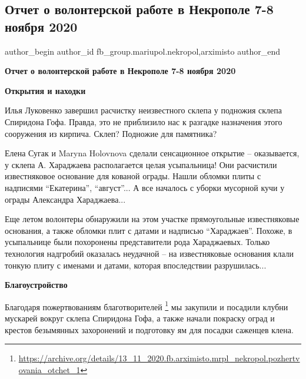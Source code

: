  
 
 
 
 

\subsection{Отчет о волонтерской работе в Некрополе 7-8 ноября 2020}
\label{sec:13_11_2020.fb.fb_group.mariupol.nekropol.2.otchet_volonter_rabota_7_8_nojabrja_2020}
 
\ifcmt
 author_begin
   author_id fb_group.mariupol.nekropol,arximisto
 author_end
\fi

\textbf{Отчет о волонтерской работе в Некрополе 7-8 ноября 2020}

\textbf{Открытия и находки}

Илья Луковенко завершил расчистку неизвестного склепа у подножия склепа
Спиридона Гофа. Правда, это не приблизило нас к разгадке назначения этого
сооружения из кирпича. Склеп? Подножие для памятника?

Елена Сугак и Maryna Holovnova сделали сенсационное открытие – оказывается, у
склепа А. Хараджаева располагается целая усыпальница! Они расчистили
известняковое основание для кованой ограды. Нашли обломки плиты с надписями
\enquote{Екатерина}, \enquote{август}... А все началось с уборки мусорной кучи у ограды
Александра Хараджаева...

Еще летом волонтеры обнаружили на этом участке прямоугольные известняковые
основания, а также обломки плит с датами и надписью \enquote{Хараджаев}. Похоже, в
усыпальнице были похоронены представители рода Хараджаевых. Только технология
надгробий оказалась неудачной – на известняковые основания клали тонкую плиту с
именами и датами, которая впоследствии разрушилась...

\textbf{Благоустройство}

Благодаря пожертвованиям благотворителей%
\footnote{\url{https://archive.org/details/13_11_2020.fb.arximisto.mrpl_nekropol.pozhertvovania_otchet_1}}
мы закупили и посадили клубни мускарей вокруг склепа Спиридона Гофа, а также
начали покраску оград и крестов безымянных захоронений и подготовку ям для
посадки саженцев клена.

